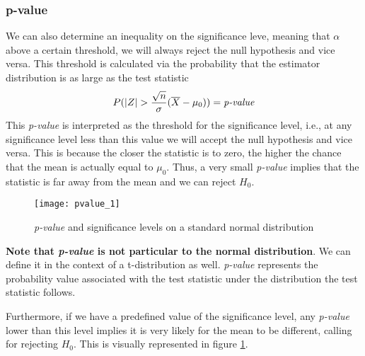 \documentclass[../probability-notes.tex]{subfiles}
\begin{document}
    \subsubsection{p-value}\label{p_value}
    We can also determine an inequality on the significance leve, meaning that $\alpha$ above a certain threshold, we will always reject the null hypothesis and vice versa.\newline
    This threshold is calculated via the probability that the estimator distribution is as large as the test statistic
    \begin{align*}
        P(|Z| > \frac{\sqrt{n}}{\sigma}(\overline{X} - \mu_{0})) = \text{\emph{p-value}}
    \end{align*}
    This \emph{p-value} is interpreted as the threshold for the significance level, i.e., at any significance level less than this value we will accept the null hypothesis and vice versa. This is because the closer the statistic is to zero, the higher the chance that the mean is actually equal to $\mu_{0}$. Thus, a very small \emph{p-value} implies that the statistic is far away from the mean and we can reject $H_{0}$.\newline

    \begin{figure}[h]
    \texttt{[image: pvalue\_1]}
    \centering
    \caption{\emph{p-value} and significance levels on a standard normal distribution}
    \label{fig:pvalue_1} %
    \end{figure}

    \textbf{Note that \emph{p-value} is not particular to the normal distribution}. We can define it in the context of a t-distribution as well. \emph{p-value} represents the probability value associated with the test statistic under the distribution the test statistic follows.\newline  
    
    Furthermore, if we have a predefined value of the significance level, any \emph{p-value} lower than this level implies it is very likely for the mean to be different, calling for rejecting $H_{0}$. This is visually represented in figure \ref{fig:pvalue_1}.\newline
\end{document}
